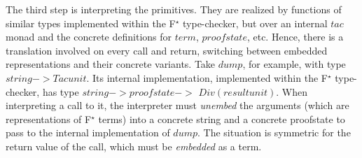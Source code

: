 \documentclass[runningheads]{llncs}
\newcommand{\kw}[1]{\text{\ls|#1|}}
\newcommand\Goal[3]{\mbox{\ensuremath{#1 \vdash \kw{#2} : \kw{#3}}\xspace}}
\newcommand\fstar{F$^\star$\xspace}
\newcommand\metafstar{Meta-F$^\star$\xspace}
\begin{document}
The third step is interpreting the primitives.
%
They are realized by functions of similar types implemented within the
\fstar type-checker, but over an internal \ls$tac$ monad and the concrete
definitions for \ls$term$, \ls$proofstate$, etc.
%
Hence, there is a translation involved on every call and return,
switching between embedded representations and their
concrete variants.
%
Take \ls$dump$, for example, with type \ls$string -> Tac unit$.
%
Its internal implementation, implemented within the \fstar type-checker,
has type
\ls$string -> proofstate ->$
\ls$Div (result unit)$.
%
When interpreting a call to it, the interpreter must \emph{unembed} the
arguments (which are representations of \fstar terms)
into a concrete string and a concrete
proofstate to pass to the internal implementation of \ls$dump$.
%
The situation is symmetric for the return value of
the call, which must be \emph{embedded} as a term.
%



\end{document}
